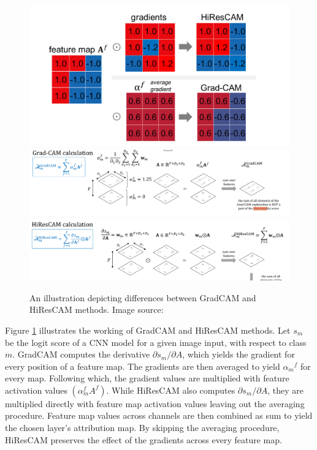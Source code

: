 \documentclass[../report.tex]{subfiles}
\begin{document}
	\begin{figure}[H]
		\centering
		\includegraphics[scale=0.3]{images/chapter3/hi_res_1.png}
		\includegraphics[scale=0.3]{images/chapter3/hi_res_2.png}
		\includegraphics[scale=0.3]{images/chapter3/hi_res_3.png}
		\caption{An illustration depicting differences between GradCAM and HiResCAM methods. Image source: \cite{draelos2020hirescam}}
		\label{fig_hires_op}
	\end{figure}
	Figure \ref{fig_hires_op} illustrates the working of GradCAM and HiResCAM methods. Let $s_m$ be the logit score of a CNN model for a given image input, with respect to class $m$. GradCAM computes the derivative $\partial s_m / \partial A$, which yields the gradient for every position of a feature map. The gradients are then averaged to yield ${\alpha_m}^f$ for every map. Following which, the gradient values are multiplied with feature activation values $(\alpha_m^f A^f)$. While HiResCAM also computes  $\partial s_m / \partial A$, they are multiplied directly with feature map activation values leaving out the averaging procedure. Feature map values across channels are then combined as sum to yield the chosen layer’s attribution map. By skipping the averaging procedure, HiResCAM preserves the effect of the gradients across every feature map.\\
\end{document}

